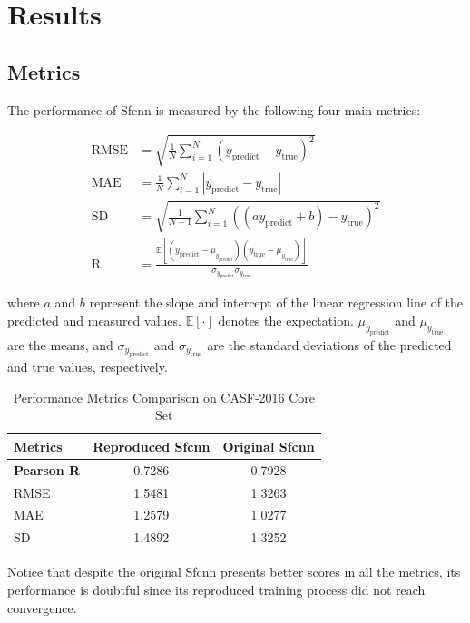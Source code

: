 \documentclass[unnumsec,webpdf,contemporary,large]{oup-authoring-template}
\theoremstyle{thmstyleone}%
\theoremstyle{thmstyletwo}%
\theoremstyle{thmstylethree}%
\begin{document}
\section{Results}

\subsection{Metrics}
The performance of Sfcnn is measured by the following four main metrics:

\begin{align*}
\mathrm{RMSE} &= \sqrt{\frac{1}{N} \sum_{i=1}^{N} (y_{\text{predict}} - y_{\text{true}})^2} \\
\mathrm{MAE} &= \frac{1}{N} \sum_{i=1}^{N} |y_{\text{predict}} - y_{\text{true}}| \\
\mathrm{SD} &= \sqrt{\frac{1}{N-1} \sum_{i=1}^{N} ((a y_{\text{predict}} + b) - y_{\text{true}})^2} \\
\mathrm{R} &= \frac{\mathbb{E}[(y_{\text{predict}} - \mu_{y_{\text{predict}}})(y_{\text{true}} - \mu_{y_{\text{true}}})]}{\sigma_{y_{\text{predict}}} \sigma_{y_{\text{true}}}}
\end{align*}

where $a$ and $b$ represent the slope and intercept of the linear regression line of the predicted and measured values. $\mathbb{E}[\cdot]$ denotes the expectation. $\mu_{y_{\text{predict}}}$ and $\mu_{y_{\text{true}}}$ are the means, and $\sigma_{y_{\text{predict}}}$ and $\sigma_{y_{\text{true}}}$ are the standard deviations of the predicted and true values, respectively.

\begin{table}[!t]
\centering
\caption{Performance Metrics Comparison on CASF-2016 Core Set}
\label{tab:metrics}
\begin{tabular}{lcc}
\toprule
Metrics & Reproduced Sfcnn & Original Sfcnn \\
\midrule
\textbf{Pearson R} & 0.7286 & 0.7928 \\
RMSE & 1.5481 & 1.3263 \\
MAE & 1.2579 & 1.0277 \\
SD & 1.4892 & 1.3252 \\
\bottomrule
\end{tabular}
\end{table}

Notice that despite the original Sfcnn presents better scores in all the metrics, its performance is doubtful since its reproduced training process did not reach convergence.
\end{document}
